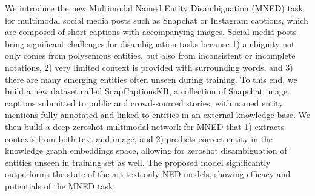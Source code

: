We introduce the new Multimodal Named Entity Disambiguation (MNED) task for multimodal social media posts such as Snapchat or Instagram captions, which are composed of short captions with accompanying images. Social media posts bring significant challenges for disambiguation tasks because 1) ambiguity not only comes from polysemous entities, but also from inconsistent or incomplete notations, 2) very limited context is provided with surrounding words, and 3) there are many emerging entities often unseen during training. To this end, we build a new dataset called SnapCaptionsKB, a collection of Snapchat image captions submitted to public and crowd-sourced stories, with named entity mentions fully annotated and linked to entities in an external knowledge base. We then build a deep zeroshot multimodal network for MNED that 1) extracts contexts from both text and image, and 2) predicts correct entity in the knowledge graph embeddings space, allowing for zeroshot disambiguation of entities unseen in training set as well. The proposed model significantly outperforms the state-of-the-art text-only NED models, showing efficacy and potentials of the MNED task.
